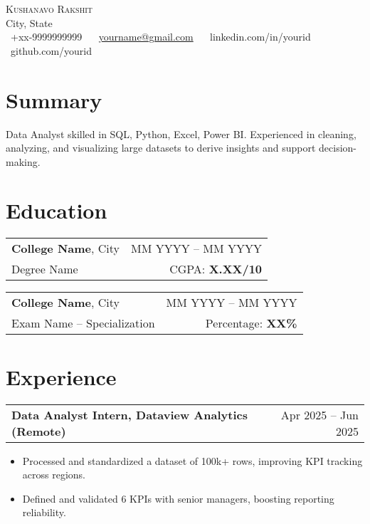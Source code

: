 \documentclass[letterpaper,10.8pt]{article}
\begin{document}
\begin{center}
    {\Large \scshape Kushanavo Rakshit} \\[3pt]
    City, State \\
    \vspace{4pt}
    {\small
    ~+xx-9999999999 ~
    ~\href{mailto:yourname@gmail.com}{yourname@gmail.com} ~
    ~linkedin.com/in/yourid ~
    ~github.com/yourid
    }
\end{center}

\section{Summary}
Data Analyst skilled in SQL, Python, Excel, Power BI. Experienced in cleaning, analyzing, and visualizing large datasets to derive insights and support decision-making.

\section{Education}
\begin{tabularx}{\linewidth}{X r}
\textbf{College Name}, City & MM YYYY – MM YYYY \\
Degree Name & CGPA: \textbf{X.XX/10} \\
\end{tabularx}

\begin{tabularx}{\linewidth}{X r}
\textbf{College Name}, City & MM YYYY – MM YYYY \\
Exam Name – Specialization & Percentage: \textbf{XX\%} \\
\end{tabularx}

\section{Experience}
\begin{tabularx}{\linewidth}{X r}
\textbf{Data Analyst Intern, Dataview Analytics (Remote)} & Apr 2025 – Jun 2025 \\
\end{tabularx}
\begin{itemize}[leftmargin=*]
    \item Processed and standardized a dataset of 100k+ rows, improving KPI tracking across regions.
    \item Defined and validated 6 KPIs with senior managers, boosting reporting reliability.
\end{itemize}
\end{document}
